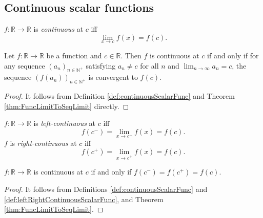 
\subsection{Continuous scalar functions}
\label{sec:cont-scal-funct}

\begin{defn}
  \label{def:continuousScalarFunc}
  $f: \mathbb{R}\rightarrow \mathbb{R}$
  is \emph{continuous} at $c$
  iff
   \begin{equation}
     \label{eq:continuous}
     \lim_{x\rightarrow c} f(x) = f(c).
   \end{equation}
\end{defn}

\begin{thm}
  \label{thm:continuousEquivSeqLimit}
  Let $f:\mathbb{R}\rightarrow \mathbb{R}$ be a function
  and $c\in \mathbb{R}$.
  Then $f$ is continuous at $c$ if and only if
  for any sequence $(a_{n})_{n\in \mathbb{N}^{+}}$ satisfying
  $a_{n}\neq c$ for all $n$ and
  $\lim_{n\rightarrow\infty}a_{n}=c$, the sequence
  $(f(a_{n}))_{n\in \mathbb{N}^{+}}$ is convergent to $f(c)$.
\end{thm}
\begin{proof}
  It follows from Definition \ref{def:continuousScalarFunc}
  and Theorem \ref{thm:FuncLimitToSeqLimit} directly.
\end{proof}

\begin{defn}
  \label{def:leftRightContinuousScalarFunc}
  $f: \mathbb{R}\rightarrow \mathbb{R}$
  is \emph{left-continuous} at $c$
  iff
   \begin{equation}
     \label{eq:leftContinuous}
     f(c^{-})=\lim_{x\rightarrow c^{-}} f(x) = f(c).
   \end{equation}
   $f$ is \emph{right-continuous} at $c$ iff
   \begin{equation}
     \label{eq:rightContinuous}
     f(c^{+})=\lim_{x\rightarrow c^{+}} f(x) = f(c).
   \end{equation}
\end{defn}

\begin{thm}
  \label{thm:OneSidedContinuityAndContinuity}
  $f:\mathbb{R}\rightarrow \mathbb{R}$ is continuous at $c$
  if and only if $f(c^{-})=f(c^{+})=f(c)$.
\end{thm}
\begin{proof}
  It follows from Definitions \ref{def:continuousScalarFunc}
  and \ref{def:leftRightContinuousScalarFunc}, and
  Theorem \ref{thm:FuncLimitToSeqLimit}.
\end{proof}

